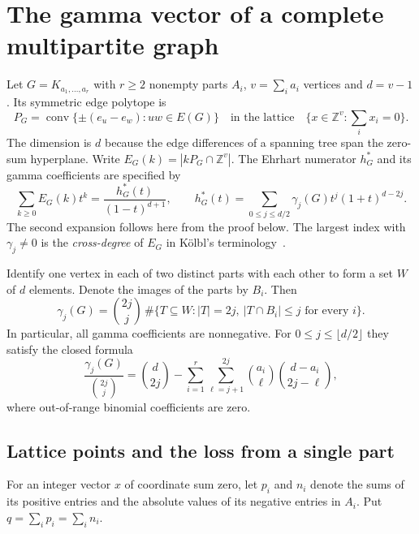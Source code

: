 \section{The gamma vector of a complete multipartite graph}\label{sec:gamma}

Let $G=K_{a_1,\ldots,a_r}$ with $r\ge2$ nonempty parts $A_i$,
$v=\sum_i a_i$ vertices and $d=v-1$. Its symmetric edge polytope is
\[
 P_G=\operatorname{conv}\{\pm(e_u-e_w):uw\in E(G)\}
 \quad\text{in the lattice}\quad
 \{x\in\mathbb Z^v:\textstyle\sum_i x_i=0\}.
\]
The dimension is $d$ because the edge differences of a spanning tree span
the zero-sum hyperplane. Write $E_G(k)=|kP_G\cap\mathbb Z^v|$.
The Ehrhart numerator $h^*_G$ and its gamma coefficients are specified by
\[
  \sum_{k\ge0} E_G(k)t^k=\frac{h^*_G(t)}{(1-t)^{d+1}},\qquad
  h^*_G(t)=\sum_{0\le j\le d/2}\gamma_j(G)t^j(1+t)^{d-2j}.
\]
The second expansion follows here from the proof below. The largest index
with $\gamma_j\ne0$ is the \emph{cross-degree} of $E_G$ in
K\"olbl's terminology~\cite[Prop.~4.3]{kolbl}.

\begin{theorem}\label{thm:gamma}
Identify one vertex in each of two distinct parts with each other to form
a set $W$ of $d$ elements. Denote the images of the parts by $B_i$.
Then
\begin{equation}\label{eq:subset-gamma}
 \gamma_j(G)=\binom{2j}{j}\,
 \#\{T\subseteq W: |T|=2j,\ |T\cap B_i|\le j\text{ for every }i\}.
\end{equation}
In particular, all gamma coefficients are nonnegative. For
$0\le j\le\lfloor d/2\rfloor$ they satisfy the closed formula
\begin{equation}\label{eq:multipartite-gamma}
 \frac{\gamma_j(G)}{\binom{2j}{j}}
  =\binom{d}{2j}-
    \sum_{i=1}^r\sum_{\ell=j+1}^{2j}
       \binom{a_i}{\ell}\binom{d-a_i}{2j-\ell},
\end{equation}
where out-of-range binomial coefficients are zero.
\end{theorem}

\subsection{Lattice points and the loss from a single part}
For an integer vector $x$ of coordinate sum zero, let $p_i$ and $n_i$
denote the sums of its positive entries and the absolute values of its
negative entries in $A_i$. Put $q=\sum_i p_i=\sum_i n_i$.

